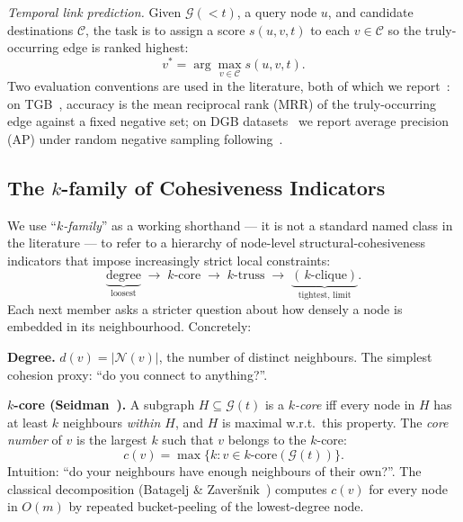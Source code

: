\documentclass[sigconf,nonacm,review]{acmart}
\newcommand{\Ncal}{\mathcal{N}}
\newcommand{\Gcal}{\mathcal{G}}
\begin{document}
\noindent\emph{Temporal link prediction.}
Given $\Gcal(<t)$, a query node $u$, and candidate destinations
$\mathcal{C}$, the task is to assign a score $s(u,v,t)$ to each
$v\in\mathcal{C}$ so the truly-occurring edge is ranked highest:
\begin{equation}
v^{*}=\arg\max_{v\in\mathcal{C}} s(u,v,t).
\end{equation}
Two evaluation conventions are used in the literature, both of which we
report~\cite{kumar2020linkpred,lu2011linkpred}: on TGB~\cite{huang2023tgb},
accuracy is the mean reciprocal rank (MRR) of the truly-occurring edge
against a fixed negative set; on DGB
datasets~\cite{poursafaei2022edgebank} we report average precision (AP)
under random negative sampling
following~\cite{mikolov2013negative,yu2023dygformer}.

\subsection{The $k$-family of Cohesiveness Indicators}
\label{sec:kfamily}
We use ``\emph{$k$-family}'' as a working shorthand --- it is not a standard
named class in the literature --- to refer to a hierarchy of node-level
structural-cohesiveness indicators that impose increasingly strict local
constraints:
\begin{equation*}
\underbrace{\text{degree}}_{\text{loosest}}
\;\to\;
k\text{-core}
\;\to\;
k\text{-truss}
\;\to\;
\underbrace{(\,k\text{-clique})}_{\text{tightest, limit}}.
\end{equation*}
Each next member asks a stricter question about how densely a node is
embedded in its neighbourhood. Concretely:

\medskip
\noindent\textbf{Degree.} $d(v)=|\Ncal(v)|$, the number of distinct
neighbours. The simplest cohesion proxy: ``do you connect to anything?''.

\medskip
\noindent\textbf{$k$-core (Seidman~\cite{seidman1983kcore}).} A subgraph
$H\subseteq\Gcal(t)$ is a \emph{$k$-core} iff every node in $H$ has at least
$k$ neighbours \emph{within $H$}, and $H$ is maximal w.r.t.\ this property.
The \emph{core number} of $v$ is the largest $k$ such that $v$ belongs to
the $k$-core:
\begin{equation}
c(v)=\max\{k:v\in k\text{-core}(\Gcal(t))\}.
\end{equation}
Intuition: ``do your neighbours have enough neighbours of their own?''. The
classical decomposition (Batagelj
\& Zaver\v{s}nik~\cite{batagelj2003cores}) computes $c(v)$ for every node in
$O(m)$ by repeated bucket-peeling of the lowest-degree node.
\end{document}
